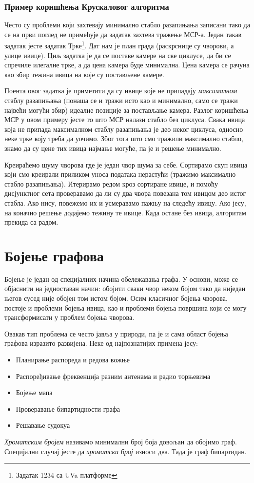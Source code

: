 \documentclass[11pt, oneside, a4paper]{article}
\begin{document}
\subsubsection*{Пример коришћења Крускаловог алгоритма}
Често су проблеми који захтевају минимално стабло разапињања записани тако да се на први поглед не примећује да задатак захтева тражење МСР-а. Један такав задатак јесте задатак \glqq Трке\grqq\footnote{Задатак 1234 са UVa платформе}. Дат нам је план града (раскрснице су чворови, а улице ивице). Циљ задатка је да се поставе камере на све циклусе, да би се спречиле илегалне трке, а да цена камера буде минимална. Цена камера се рачуна као збир тежина ивица на које су постављене камере.\par
Поента овог задатка је приметити да су ивице које не припадају \textit{максималном} стаблу разапињања (понаша се и тражи исто као и минимално, само се тражи највећи могући збир) идеалне позиције за постављање камера. Разлог коришћења МСР у овом примеру јесте то што МСР налази стабло без циклуса. Свака ивица која не припада максималном стаблу разапињања је део неког циклуса, односно неке трке коју треба да уочимо. Због тога што смо тражили максимално стабло, знамо да су цене тих ивица најмање могуће, па је и решење минимално.  \par
Креираћемо шуму чворова где је један чвор шума за себе. Сортирамо скуп ивица који смо креирали приликом уноса података нерастући (тражимо максимално стабло разапињања). Итерирамо редом кроз сортиране ивице, и помоћу дисјунктног сета проверавамо да ли су два чвора повезана том ивицом део истог стабла. Ако нису, повежемо их и усмеравамо пажњу на следећу ивицу. Ако јесу, на коначно решење додајемо тежину те ивице. Када остане без ивица, алгоритам прекида са радом.
\newpage

\section{Бојење графова}
Бојење је један од специјалних начина обележавања графа. У основи, може се објаснити на једноставан начин: обојити сваки чвор неком бојом тако да ниједан његов сусед није обојен том истом бојом. Осим класичног бојења чворова, постоје и проблеми бојења ивица, као и проблеми бојења површина који се могу трансформисати у проблем бојења чворова. \par
Овакав тип проблема се често јавља у природи, па је и сама област бојења графова изразито развијена. Неке од најпознатијих примена јесу:
\begin{itemize}
    \item Планирање распореда и редова вожње
    \item Распоређивање фреквенција разним антенама и радио торњевима
    \item Бојење мапа
    \item Проверавање бипартидности графа
    \item Решавање судокуа
\end{itemize}
\textit{Хроматским бројем} називамо минимални број боја довољан да обојимо граф. Специјални случај јесте да \textit{хроматски број} износи два. Тада је граф бипартидан. 
\end{document}
